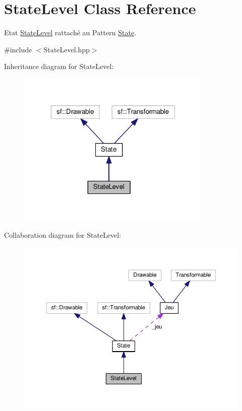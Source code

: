 \hypertarget{class_state_level}{\section{State\+Level Class Reference}
\label{class_state_level}
}


Etat \hyperlink{class_state_level}{State\+Level} rattaché au Pattern \hyperlink{class_state}{State}.  




{\ttfamily \#include $<$State\+Level.\+hpp$>$}



Inheritance diagram for State\+Level\+:
\nopagebreak
\begin{figure}[H]
\begin{center}
\leavevmode
\includegraphics[width=263pt]{class_state_level__inherit__graph}
\end{center}
\end{figure}


Collaboration diagram for State\+Level\+:
\nopagebreak
\begin{figure}[H]
\begin{center}
\leavevmode
\includegraphics[width=350pt]{class_state_level__coll__graph}
\end{center}
\end{figure}
